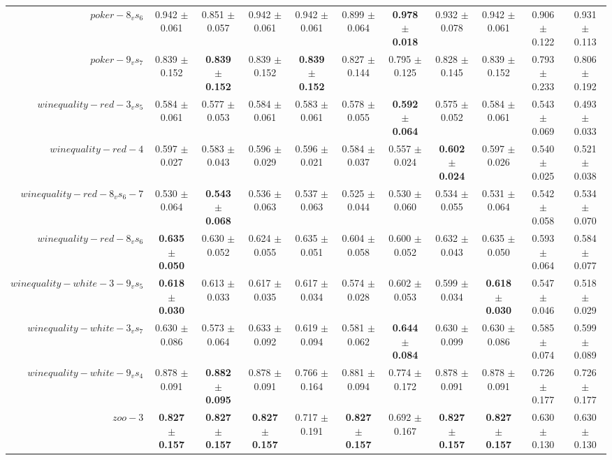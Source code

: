 \begin{table}[!ht]
{\begin{tabular}{r c c c c c c c c c c}
$poker-8_vs_6$ & 0.942 $\pm$ 0.061 & 0.851 $\pm$ 0.057 & 0.942 $\pm$ 0.061 & 0.942 $\pm$ 0.061 & 0.899 $\pm$ 0.064 & \textbf{0.978 $\pm$ 0.018} & 0.932 $\pm$ 0.078 & 0.942 $\pm$ 0.061 & 0.906 $\pm$ 0.122 & 0.931 $\pm$ 0.113 \\
$poker-9_vs_7$ & 0.839 $\pm$ 0.152 & \textbf{0.839 $\pm$ 0.152} & 0.839 $\pm$ 0.152 & \textbf{0.839 $\pm$ 0.152} & 0.827 $\pm$ 0.144 & 0.795 $\pm$ 0.125 & 0.828 $\pm$ 0.145 & 0.839 $\pm$ 0.152 & 0.793 $\pm$ 0.233 & 0.806 $\pm$ 0.192 \\
$winequality-red-3_vs_5$ & 0.584 $\pm$ 0.061 & 0.577 $\pm$ 0.053 & 0.584 $\pm$ 0.061 & 0.583 $\pm$ 0.061 & 0.578 $\pm$ 0.055 & \textbf{0.592 $\pm$ 0.064} & 0.575 $\pm$ 0.052 & 0.584 $\pm$ 0.061 & 0.543 $\pm$ 0.069 & 0.493 $\pm$ 0.033 \\
$winequality-red-4$ & 0.597 $\pm$ 0.027 & 0.583 $\pm$ 0.043 & 0.596 $\pm$ 0.029 & 0.596 $\pm$ 0.021 & 0.584 $\pm$ 0.037 & 0.557 $\pm$ 0.024 & \textbf{0.602 $\pm$ 0.024} & 0.597 $\pm$ 0.026 & 0.540 $\pm$ 0.025 & 0.521 $\pm$ 0.038 \\
$winequality-red-8_vs_6-7$ & 0.530 $\pm$ 0.064 & \textbf{0.543 $\pm$ 0.068} & 0.536 $\pm$ 0.063 & 0.537 $\pm$ 0.063 & 0.525 $\pm$ 0.044 & 0.530 $\pm$ 0.060 & 0.534 $\pm$ 0.055 & 0.531 $\pm$ 0.064 & 0.542 $\pm$ 0.058 & 0.534 $\pm$ 0.070 \\
$winequality-red-8_vs_6$ & \textbf{0.635 $\pm$ 0.050} & 0.630 $\pm$ 0.052 & 0.624 $\pm$ 0.055 & 0.635 $\pm$ 0.051 & 0.604 $\pm$ 0.058 & 0.600 $\pm$ 0.052 & 0.632 $\pm$ 0.043 & 0.635 $\pm$ 0.050 & 0.593 $\pm$ 0.064 & 0.584 $\pm$ 0.077 \\
$winequality-white-3-9_vs_5$ & \textbf{0.618 $\pm$ 0.030} & 0.613 $\pm$ 0.033 & 0.617 $\pm$ 0.035 & 0.617 $\pm$ 0.034 & 0.574 $\pm$ 0.028 & 0.602 $\pm$ 0.053 & 0.599 $\pm$ 0.034 & \textbf{0.618 $\pm$ 0.030} & 0.547 $\pm$ 0.046 & 0.518 $\pm$ 0.029 \\
$winequality-white-3_vs_7$ & 0.630 $\pm$ 0.086 & 0.573 $\pm$ 0.064 & 0.633 $\pm$ 0.092 & 0.619 $\pm$ 0.094 & 0.581 $\pm$ 0.062 & \textbf{0.644 $\pm$ 0.084} & 0.630 $\pm$ 0.099 & 0.630 $\pm$ 0.086 & 0.585 $\pm$ 0.074 & 0.599 $\pm$ 0.089 \\
$winequality-white-9_vs_4$ & 0.878 $\pm$ 0.091 & \textbf{0.882 $\pm$ 0.095} & 0.878 $\pm$ 0.091 & 0.766 $\pm$ 0.164 & 0.881 $\pm$ 0.094 & 0.774 $\pm$ 0.172 & 0.878 $\pm$ 0.091 & 0.878 $\pm$ 0.091 & 0.726 $\pm$ 0.177 & 0.726 $\pm$ 0.177 \\
$zoo-3$ & \textbf{0.827 $\pm$ 0.157} & \textbf{0.827 $\pm$ 0.157} & \textbf{0.827 $\pm$ 0.157} & 0.717 $\pm$ 0.191 & \textbf{0.827 $\pm$ 0.157} & 0.692 $\pm$ 0.167 & \textbf{0.827 $\pm$ 0.157} & \textbf{0.827 $\pm$ 0.157} & 0.630 $\pm$ 0.130 & 0.630 $\pm$ 0.130 \\

\end{tabular}}
\end{table}
